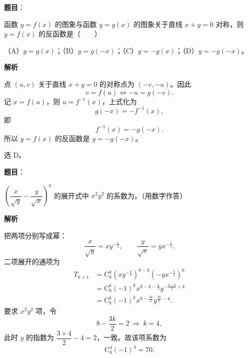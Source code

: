 \begin{answer}

\textbf{题目}：

函数 $y=f(x)$ 的图象与函数 $y=g(x)$ 的图象关于直线 $x+y=0$ 对称，则 $y=f(x)$ 的反函数是\mbox{（　　）}

（A）$y=g(x)$；（B）$y=g(-x)$；（C）$y=-g(x)$；（D）$y=-g(-x)$。

\textbf{解析}

点 $(u,v)$ 关于直线 $x+y=0$ 的对称点为 $(-v,-u)$。因此
\nopagebreak[4]
\[v=f(u)\iff -u=g(-v).\]
记 $x=f(u)$，则 $u=f^{-1}(x)$，上式化为
\nopagebreak[4]
\[g(-x)=-f^{-1}(x),\]
即
\nopagebreak[4]
\[f^{-1}(x)=-g(-x).\]
所以 $y=f(x)$ 的反函数是 $y=-g(-x)$。

选 D。


\end{answer}
\begin{answer}

\textbf{题目}：

$\left(\dfrac{x}{\sqrt y}-\dfrac{y}{\sqrt x}\right)^8$ 的展开式中 $x^2y^2$ 的系数为\gkblank{}。（用数字作答）

\textbf{解析}

把两项分别写成幂：
\nopagebreak[4]
\[\frac{x}{\sqrt y}=xy^{-\frac12},\qquad \frac{y}{\sqrt x}=yx^{-\frac12}.\]
二项展开的通项为
\nopagebreak[4]
\[\begin{aligned}
T_{k+1}
&=\mathrm C_8^k\left(xy^{-\frac12}\right)^{8-k}\left(-yx^{-\frac12}\right)^k\\
&=\mathrm C_8^k(-1)^k x^{8-k-\frac k2}y^{-\frac{8-k}{2}+k}\\
&=\mathrm C_8^k(-1)^k x^{8-\frac{3k}{2}}y^{\frac{3k}{2}-4}.
\end{aligned}\]
要求 $x^2y^2$ 项，令
\nopagebreak[4]
\[8-\frac{3k}{2}=2\ \Longrightarrow\ k=4,\]
此时 $y$ 的指数为 $\dfrac{3\times4}{2}-4=2$，一致。故该项系数为
\nopagebreak[4]
\[\mathrm C_8^4(-1)^4=70.\]


\end{answer}
